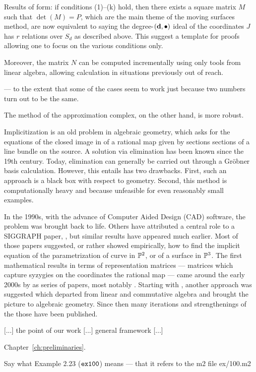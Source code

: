 \documentclass[fleqn,reqno]{amsart}
\begin{document}
Results of form:
if conditions (1)--(k) hold, then there exists a square matrix $M$ such that $\det(M)=P$,
which are the main theme of the moving surfaces method,
are now equivalent to saying the degree-$(\mathbf d,\bullet)$
ideal of the coordinates $J$ has $r$ relations over $S_d$
as described above.
This suggest a template for proofs allowing one to focus on the various conditions only.

Moreover, the matrix $N$ can be computed incrementally
using only tools from linear algebra,
allowing calculation in situations previously out of reach.

--- to the extent that some of the cases seem to work just because
two numbers turn out to be the same.

The method of the approximation complex, on the other hand, is more robust.

\newpage
Implicitization is an old problem in algebraic geometry,
which asks for the equations of the closed image in of a rational map
given by sections sections of a line bundle on the source.
A solution via elimination has been known since the 19th century.
Today, elimination can generally be carried out through a Gr\"obner basis calculation.
However, this entails has two drawbacks.
First, such an approach is a black box with respect to geometry.
Second, this method is computationally heavy and because unfeasible for even reasonably
small examples.

In the 1990s, with the advance of Computer Aided Design (CAD) software,
the problem was brought back to life.
Others have attributed a central role to a SIGGRAPH paper, \citet{SC-95},
but similar results have appeared much earlier.
Most of those papers suggested, or rather showed empirically, how to find the implicit equation 
of the parametrization of curve in $\mathbb{P}^2$, or of a surface in $\mathbb{P}^3$.
The first mathematical results in terms of representation matrices ---
matrices which capture syzygies on the coordinates the rational map ---
came around the early 2000s by as series of papers, most notably \citet{CGZ-00}.
Starting with \citet{BJ-03}, another approach was suggested which departed from
linear and commutative algebra and brought the picture to algebraic geometry.
Since then many iterations and strengthenings of the those have been published.

[...] the point of our work [...] general framework [...]

Chapter~\ref{ch:preliminaries}.

Say what Example 2.23 ($\mathop{\tt ex100}$) means --- that it refers to the m2 file ex/100.m2
\end{document}
